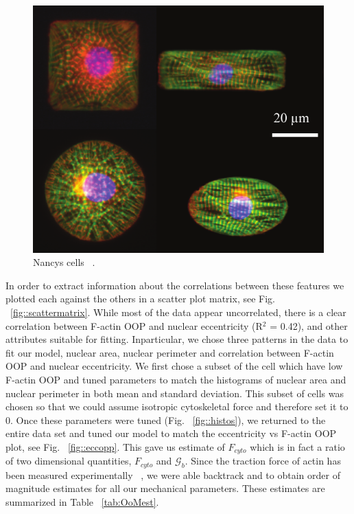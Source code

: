 \begin{figure}[h]
\centering
\captionsetup{width=.9\linewidth}
\includegraphics[width=4.5in]{Project3/figs/nancycells.pdf}
\caption{Nancys cells ~\cite{Drew2016}.}
\label{fig::nancycells}
\end{figure}

In order to extract information about the correlations between these features we plotted each against the others in a scatter plot matrix, see Fig. ~\ref{fig::scattermatrix}. While most of the data appear uncorrelated, there is a clear correlation between F-actin OOP and nuclear eccentricity (R$^2$ = 0.42), and other attributes suitable for fitting. Inparticular, we chose three patterns in the data to fit our model, nuclear area, nuclear perimeter and correlation between F-actin OOP and nuclear eccentricity. We first chose a subset of the cell which have low F-actin OOP and tuned parameters to match the histograms of nuclear area and nuclear perimeter in both mean and standard deviation. This subset of cells was chosen so that we could assume isotropic cytoskeletal force and therefore set it to 0. Once these parameters were tuned (Fig. ~\ref{fig::histos}), we returned to the entire data set and tuned our model to match the eccentricity vs F-actin OOP plot, see Fig. ~\ref{fig::eccopp}. This gave us estimate of $F_{cyto}$ which is in fact a ratio of two dimensional quantities, $F_{cyto}$ and  $\mathcal{G}_b$. Since the traction force of actin has been measured experimentally ~\cite{Kuo2012}, we were able backtrack and to obtain order of magnitude estimates for all our mechanical parameters. These estimates are summarized in Table ~\ref{tab:OoMest}.

